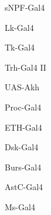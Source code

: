 \documentclass[17pt]{extarticle}
\begin{document}
\footnotesize
\vspace*{\fill}
\newpage{}
\vspace*{\fill}\begin{large}
sNPF-Gal4 \\[0.5em]
\end{large}
\footnotesize
\vspace*{\fill}
\newpage{}
\vspace*{\fill}\begin{large}
Lk-Gal4 \\[0.5em]
\end{large}
\footnotesize
\vspace*{\fill}
\newpage{}
\vspace*{\fill}\begin{large}
Tk-Gal4 \\[0.5em]
\end{large}
\footnotesize
\vspace*{\fill}
\newpage{}
\vspace*{\fill}\begin{normalsize}
Trh-Gal4 II \\[0.5em]
\end{normalsize}
\footnotesize
\vspace*{\fill}
\newpage{}
\vspace*{\fill}\begin{large}
UAS-Akh \\[0.5em]
\end{large}
\footnotesize
\vspace*{\fill}
\newpage{}
\vspace*{\fill}\begin{large}
Proc-Gal4 \\[0.5em]
\end{large}
\footnotesize
\vspace*{\fill}
\newpage{}
\vspace*{\fill}\begin{large}
ETH-Gal4 \\[0.5em]
\end{large}
\footnotesize
\vspace*{\fill}
\newpage{}
\vspace*{\fill}\begin{large}
Dsk-Gal4 \\[0.5em]
\end{large}
\footnotesize
\vspace*{\fill}
\newpage{}
\vspace*{\fill}\begin{large}
Burs-Gal4 \\[0.5em]
\end{large}
\footnotesize
\vspace*{\fill}
\newpage{}
\vspace*{\fill}\begin{large}
AstC-Gal4 \\[0.5em]
\end{large}
\footnotesize
\vspace*{\fill}
\newpage{}
\vspace*{\fill}\begin{large}
Ms-Gal4 \\[0.5em]
\end{large}
\footnotesize
\vspace*{\fill}
\newpage
\end{document}
